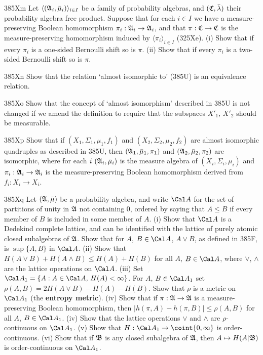 {\spheader 385Xm %
Let $\langle(\frak A_i,\bar\mu_i)\rangle_{i\in I}$ be a
family of probability algebras, and $(\frak C,\bar\lambda)$ their
probability algebra free product.   Suppose that for each
$i\in I$ we have a measure-preserving Boolean homomorphism
$\pi_i:\frak A_i\to\frak A_i$, and that $\pi:\frak C\to\frak C$ is the
measure-preserving homomorphism induced by
$\langle\pi_i\rangle_{i\in I}$ (325Xe).   (i) Show that if every $\pi_i$
is a one-sided
Bernoulli shift so is $\pi$.   (ii) Show that if every $\pi_i$ is a
two-sided Bernoulli shift so is $\pi$.
     
\spheader 385Xn %
Show that the relation `almost isomorphic to' (385U)
is an equivalence relation.
     
\spheader 385Xo %
Show that the concept of `almost isomorphism'
described in 385U is not changed if we amend the definition to require
that the subspaces $X'_1$, $X'_2$ should be measurable.
     
\spheader 385Xp %
Show that if $(X_1,\Sigma_1,\mu_1,f_1)$ and
$(X_2,\Sigma_2,\mu_2,f_2)$ are almost isomorphic quadruples as described
in 385U, then $(\frak A_1,\bar\mu_1,\pi_1)$ and $(\frak
A_2,\bar\mu_2,\pi_2)$ are isomorphic, where for each
$i\,\,(\frak A_i,\bar\mu_i)$ is the measure algebra of
$(X_i,\Sigma_i,\mu_i)$ and
$\pi_i:\frak A_i\to\frak A_i$ is the measure-preserving Boolean
homomorphism derived from $f_i:X_i\to X_i$.
     
\spheader 385Xq %
Let $(\frak A,\bar\mu)$ be a probability algebra, and
write $\Cal A$ for the set of partitions of unity in
$\frak A$ not containing $0$, ordered by saying that $A\le B$ if every
member
of $B$ is included in some member of $A$.   (i) Show that $\Cal A$ is a
Dedekind complete lattice, and can be identified with the lattice of
purely atomic closed subalgebras of $\frak A$.   Show that for $A$,
$B\in\Cal A$, $A\vee B$, as defined in 385F, is $\sup\{A,B\}$ in $\Cal
A$.   (ii) Show that $H(A\vee B)+H(A\wedge B)\le
H(A)+H(B)$ for all $A$, $B\in\Cal A$, where $\vee$, $\wedge$ are the
lattice operations on $\Cal A$.   (iii) Set $\Cal A_1=\{A:A\in\Cal
A,\,H(A)<\infty\}$.   For $A$, $B\in\Cal A_1$ set
$\rho(A,B)=2 H(A\vee B)-H(A)-H(B)$.   Show that $\rho$ is a metric on
$\Cal A_1$ (the {\bf entropy metric}).   (iv) Show that if $\pi:\frak
A\to\frak A$ is a measure-preserving Boolean homomorphism, then
$|h(\pi,A)-h(\pi,B)|\le\rho(A,B)$ for all $A$, $B\in\Cal A_1$.   (iv)
Show that the lattice operations $\vee$ and $\wedge$ are
$\rho$-continuous
on $\Cal A_1$.   (v) Show that $H:\Cal A_1\to \coint{0,\infty}$ is
order-continuous.   (vi) Show that if $\frak B$ is any closed subalgebra
of $\frak A$, then $A\mapsto H(A|\frak B)$ is order-continuous on
$\Cal A_1$.
     
}
